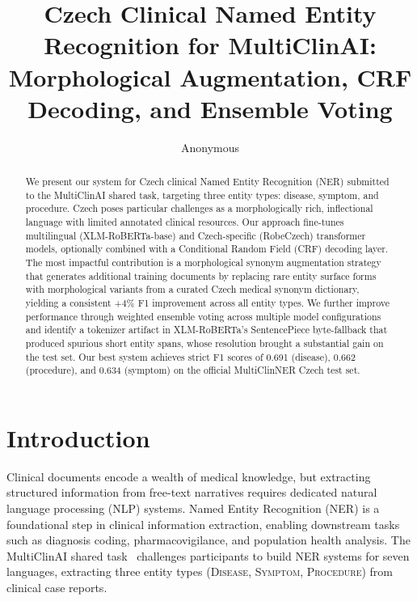 \documentclass[11pt]{article}
\title{Czech Clinical Named Entity Recognition for MultiClinAI:\\
Morphological Augmentation, CRF Decoding, and Ensemble Voting}
\author{Anonymous}
\begin{document}
\maketitle

\begin{abstract}
We present our system for Czech clinical Named Entity Recognition (NER) submitted to the MultiClinAI
shared task, targeting three entity types: disease, symptom, and procedure. Czech poses particular challenges
as a morphologically rich, inflectional language with limited annotated clinical resources. Our approach
fine-tunes multilingual (XLM-RoBERTa-base) and Czech-specific (RobeCzech) transformer models, optionally
combined with a Conditional Random Field (CRF) decoding layer. The most impactful contribution is a
morphological synonym augmentation strategy that generates additional training documents by replacing rare
entity surface forms with morphological variants from a curated Czech medical synonym dictionary, yielding
a consistent +4\% F1 improvement across all entity types. We further improve performance through weighted
ensemble voting across multiple model configurations and identify a tokenizer artifact in XLM-RoBERTa's
SentencePiece byte-fallback that produced spurious short entity spans, whose resolution brought a substantial
gain on the test set. Our best system achieves strict F1 scores of 0.691 (disease), 0.662 (procedure), and
0.634 (symptom) on the official MultiClinNER Czech test set.
\end{abstract}

\section{Introduction}

Clinical documents encode a wealth of medical knowledge, but extracting structured information from
free-text narratives requires dedicated natural language processing (NLP) systems. Named Entity Recognition
(NER) is a foundational step in clinical information extraction, enabling downstream tasks such as diagnosis
coding, pharmacovigilance, and population health analysis. The MultiClinAI shared task~\cite{multiclinai2026}
challenges participants to build NER systems for seven languages, extracting three entity types
(\textsc{Disease}, \textsc{Symptom}, \textsc{Procedure}) from clinical case reports.
\end{document}
